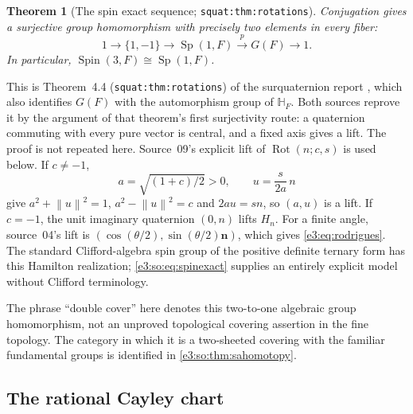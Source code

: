 \documentclass[11pt,letterpaper]{article}
\numberwithin{equation}{section}
\newtheorem{theorem}{Theorem}[section]
\theoremstyle{definition}
\theoremstyle{remark}
\newcommand{\HH}{\mathbb H}
\newcommand{\Sp}{\operatorname{Sp}}
\newcommand{\Spin}{\operatorname{Spin}}
\newcommand{\Rot}{\operatorname{Rot}}
\newcommand{\norm}[1]{\left\lVert#1\right\rVert}
\newcommand{\vv}[1]{\bm{#1}}
\begin{document}
\begin{theorem}[The spin exact sequence; \texttt{squat:thm:rotations}]\label{e3:thm:spin}\label{e3:so:thm:spin}
Conjugation gives a surjective group homomorphism with precisely two elements
in every fiber:
\begin{equation}\label{e3:so:eq:spinexact}
 1\longrightarrow\{1,-1\}\longrightarrow\Sp(1,F)
 \xrightarrow{\ p\ }G(F)\longrightarrow1.
\end{equation}
In particular, $\Spin(3,F)\cong\Sp(1,F)$.
\end{theorem}

This is Theorem~4.4 (\texttt{squat:thm:rotations}) of the surquaternion
report \cite{RepoQuaternion}, which also identifies $G(F)$ with the
automorphism group of $\HH_F$. Both sources reprove it by the argument of that
theorem's first surjectivity route: a quaternion commuting with every pure
vector is central, and a fixed axis gives a lift. The proof is not repeated
here. Source~09's explicit lift of $\Rot(n;c,s)$ is used below. If $c\ne-1$,
\begin{equation}\label{e3:so:eq:spinlift}
 a=\sqrt{(1+c)/2}>0,\qquad u=\frac{s}{2a}\,n
\end{equation}
give $a^2+\norm{u}^2=1$, $a^2-\norm{u}^2=c$ and $2au=sn$, so $(a,u)$ is a lift. If
$c=-1$, the unit imaginary quaternion $(0,n)$ lifts $H_n$. For a finite angle,
source~04's lift is $(\cos(\theta/2),\sin(\theta/2)\vv n)$, which gives
\cref{e3:eq:rodrigues}. The standard Clifford-algebra spin group of the positive
definite ternary form has this Hamilton realization;
\cref{e3:so:eq:spinexact} supplies an entirely explicit model without Clifford
terminology.

The phrase ``double cover'' here denotes this two-to-one algebraic group
homomorphism, not an unproved topological covering assertion in the fine
topology. The category in which it is a two-sheeted covering with the familiar
fundamental groups is identified in \cref{e3:so:thm:sahomotopy}.

\subsection{The rational Cayley chart}\label{e3:sub:cayley}
\end{document}
